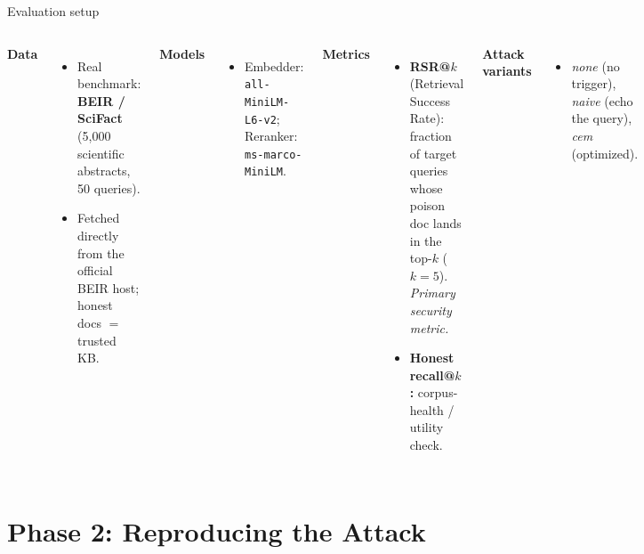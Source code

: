 \documentclass[aspectratio=169,11pt]{beamer}
\begin{document}
\begin{frame}{Evaluation setup}
  \small
  \begin{columns}[T]
    \textbf{Data}
    \begin{itemize}\scriptsize
      \item Real benchmark: \textbf{BEIR / SciFact} (5{,}000 scientific abstracts, 50 queries).
      \item Fetched directly from the official BEIR host; honest docs $=$ trusted KB.
    \end{itemize}
    \textbf{Models}
    \begin{itemize}\scriptsize
      \item Embedder: \texttt{all-MiniLM-L6-v2}; Reranker: \texttt{ms-marco-MiniLM}.
    \end{itemize}
    \textbf{Metrics}
    \begin{itemize}\scriptsize
      \item \textbf{RSR@$k$} (Retrieval Success Rate): fraction of target queries whose poison doc lands in the top-$k$ ($k{=}5$). \emph{Primary security metric.}
      \item \textbf{Honest recall@$k$:} corpus-health / utility check.
    \end{itemize}
    \textbf{Attack variants}
    \begin{itemize}\scriptsize
      \item \emph{none} (no trigger), \emph{naive} (echo the query), \emph{cem} (optimized).
    \end{itemize}
  \end{columns}
\end{frame}

\section{Phase 2: Reproducing the Attack}
\end{document}

